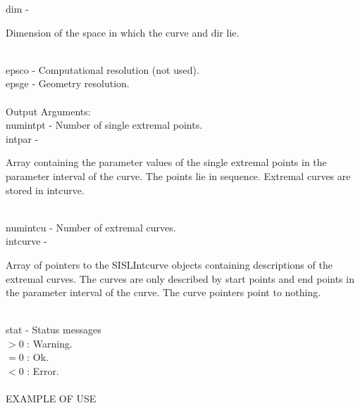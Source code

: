         \>\>    {\fov dim}      \> - \> \begin{minipg2}
                                Dimension of the space in which the
                                curve and {\fov dir} lie.
                                \end{minipg2}\\[0.3ex]
        \>\>    {\fov epsco}    \> - \> Computational resolution (not used).\\
        \>\>    {\fov epsge}    \> - \> Geometry resolution.\\
\\
        \>Output Arguments:\\
        \>\>    {\fov numintpt}\> - \>  Number of single extremal points.\\
        \>\>    {\fov intpar}   \> - \> \begin{minipg2}
                                Array containing the parameter values of the
                                single extremal points in the parameter
                                interval of the curve. The points lie in sequence.
                                Extremal curves are stored in intcurve.
                                \end{minipg2}\\[0.8ex]
        \>\>    {\fov numintcu}\> - \>  Number of extremal curves.\\
        \>\>    {\fov intcurve}\> - \>  \begin{minipg2}
                                Array of pointers to the SISLIntcurve objects
                                containing descriptions of the extremal
                                curves. The curves are only described by
                                start points and end points in
                                the parameter interval of the curve. The
                                curve pointers point to nothing.
                                \end{minipg2}\\[0.3ex]
\newpagetabs
        \>\>    {\fov stat}     \> - \> Status messages\\
                \>\>\>\>\>              $> 0$   : Warning.\\
                \>\>\>\>\>              $= 0$   : Ok.\\
                \>\>\>\>\>              $< 0$   : Error.\\
\\
EXAMPLE OF USE\\

